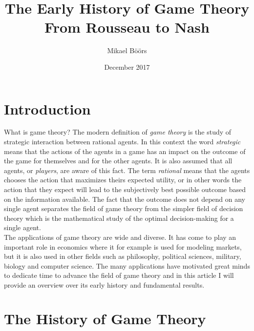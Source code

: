 \documentclass{article}
\title{The Early History of Game Theory\\
  \large From Rousseau to Nash}
\author{Mikael Böörs}
\affil{University of Gothenburg}
\date{December 2017}
\theoremstyle{definition}
\theoremstyle{remark}
\begin{document}
\maketitle
\thispagestyle{empty}
\newpage
\cleardoublepage
\setcounter{page}{1}

\section{Introduction}
What is game theory? The modern definition of \emph{game theory} is
the study of strategic interaction between rational agents. In this
context the word \emph{strategic} means that the actions of the agents
in a game has an impact on the outcome of the game for themselves and
for the other agents. It is also assumed that all agents, or \emph{players}, are aware of
this fact. The term \emph{rational} means that the agents chooses the
action that maximizes theirs expected utility, or in other words the
action that they expect will lead to the subjectively best possible
outcome based on the information available. The fact that the outcome
does not depend on any single agent separates the field of game theory
from the simpler field of decision theory which is the mathematical
study of the optimal decision-making for a single agent.\\

The applications of game theory are wide and diverse. It has come to
play an important role in economics where it for example is used for
modeling markets, but it is also used in other fields such as
philosophy, political sciences, military, biology and computer
science. \citep{Maschler} The many applications have motivated great
minds to dedicate time to advance the field of game theory and in this
article I will provide an overview over its early history and
fundamental results.

\section{The History of Game Theory}\label{The History of Game Theory}
\end{document}

